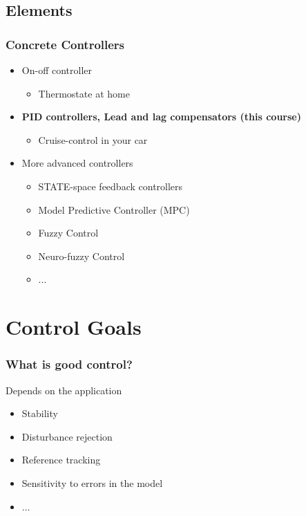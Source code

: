 \subsection[Elements]{Elements}
\begin{frame}
	\frametitle{Concrete Controllers}
	\begin{itemize}
		\item On-off controller
		\begin{itemize}
			\item Thermostate at home
		\end{itemize}
		\item \textbf{PID controllers, Lead and lag compensators (this course)}
		\begin{itemize}
			\item Cruise-control in your car
		\end{itemize}
		\item More advanced controllers
		\begin{itemize}
			\item STATE-space feedback controllers
			\item Model Predictive Controller (MPC)
			\item Fuzzy Control
			\item Neuro-fuzzy Control
			\item ...
		\end{itemize}
	\end{itemize}
\end{frame}


\section{Control Goals}
\begin{frame}
	\frametitle{What is good control?}
	\begin{block}{Depends on the application}
		\begin{itemize}
			\item Stability
			\item Disturbance rejection
			\item Reference tracking
			\item Sensitivity to errors in the model
			\item ...
		\end{itemize}
	\end{block}
\end{frame}

